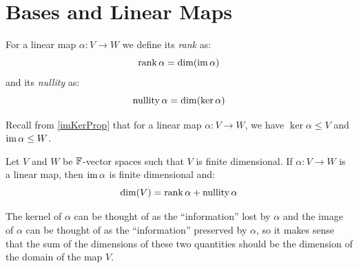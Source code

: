 \documentclass[../main.tex]{subfiles}
\begin{document}
\section{Bases and Linear Maps}
\begin{definition}
  For a linear map $\alpha: V \to W$ we define its \textit{rank} as:
  \[
    \operatorname{rank} \alpha = \dim(\operatorname{im} \alpha)
  \]
  and its \textit{nullity} as:
  \[
    \operatorname{nullity} \alpha = \dim(\ker \alpha)
  \]
\end{definition}
\begin{remark}[Recap]
  Recall from \cref{imKerProp} that for a linear map $\alpha: V \to W$, we have $\ker \alpha \leq V$ and $\operatorname{im} \alpha \leq W$.
\end{remark}
\begin{theorem}
  Let $V$ and $W$ be $\mathbb{F}$-vector spaces such that $V$ is finite dimensional.
  If $\alpha: V \to W$ is a linear map, then $\operatorname{im} \alpha$ is finite dimensional and: \label{RNT}
  \[
    \dim(V) = \operatorname{rank} \alpha + \operatorname{nullity} \alpha
  \]
\end{theorem}
\begin{remark}[Intuition]
  The kernel of $\alpha$ can be thought of as the ``information'' lost by $\alpha$ and the image of $\alpha$ can be thought of as the ``information'' preserved by $\alpha$, so it makes sense that the sum of the dimensions of these two quantities should be the dimension of the domain of the map $V$.
\end{remark}
\end{document}
